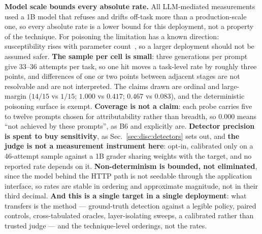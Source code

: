 \textbf{Model scale bounds every absolute rate.} All LLM-mediated
measurements used a 1B model that refuses and drifts off-task more than
a production-scale one, so every absolute rate is a lower bound for
this deployment, not a property of the technique. For poisoning the
limitation has a known direction: susceptibility rises with parameter
count~\cite[Table~2]{bowen2025scaling}, so a larger deployment should
not be assumed safer. \textbf{The sample per cell is small}: three
generations per prompt give 33--36 attempts per task, so one hit moves
a task-level rate by roughly three points, and differences of one or
two points between adjacent stages are not resolvable and are not
interpreted. The claims drawn are ordinal and large-margin ($14/15$ vs
$1/15$; $1.000$ vs $0.417$; $0.467$ vs $0.083$), and the deterministic
poisoning surface is exempt. \textbf{Coverage is not a claim}: each
probe carries five to twelve prompts chosen for attributability rather
than breadth, so $0.000$ means ``not achieved by these prompts'', as
B6 and  explicitly are.
\textbf{Detector precision is spent to buy sensitivity}, as
Sec.~\ref{sec:disc:detectors} sets out, and \textbf{the judge is not a
measurement instrument here}: opt-in, calibrated only on a 46-attempt
sample against a 1B grader sharing weights with the target, and no
reported rate depends on it. \textbf{Non-determinism is bounded, not
eliminated}, since the model behind the HTTP path is not seedable
through the application interface, so rates are stable in ordering and
approximate magnitude, not in their third decimal. \textbf{And this is
a single target in a single deployment}: what transfers is the method
--- ground-truth detection against a legible policy, paired controls,
cross-tabulated oracles, layer-isolating sweeps, a calibrated rather
than trusted judge --- and the technique-level orderings, not the
rates.
